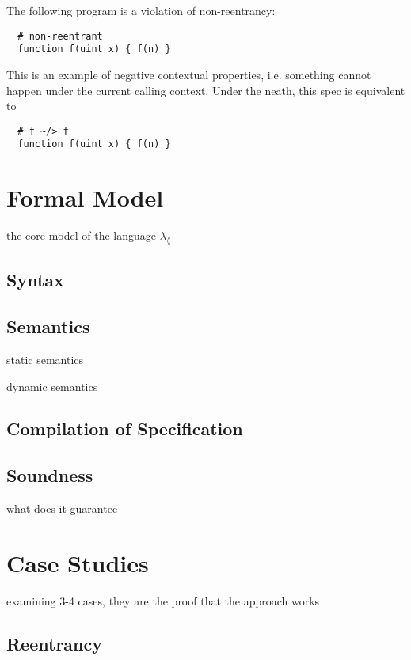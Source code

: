 \documentclass[acmsmall,review,anonymous]{acmart}\settopmatter{printfolios=true,printccs=false,printacmref=false}
\begin{document}
The following program is a violation of non-reentrancy:

\begin{lstlisting}
  # non-reentrant
  function f(uint x) { f(n) }
\end{lstlisting}

This is an example of negative contextual properties, i.e. something cannot
happen under the current calling context. Under the neath, this spec is
equivalent to

\begin{lstlisting}
  # f ~/> f
  function f(uint x) { f(n) }
\end{lstlisting}

\section{Formal Model}

the core model of the language $\lambda_\lang$

\subsection{Syntax}



\subsection{Semantics}

static semantics

dynamic semantics

\subsection{Compilation of Specification}

\subsection{Soundness}

what does it guarantee

\section{Case Studies}

examining 3-4 cases, they are the proof that the approach works

\subsection{Reentrancy}
\end{document}
